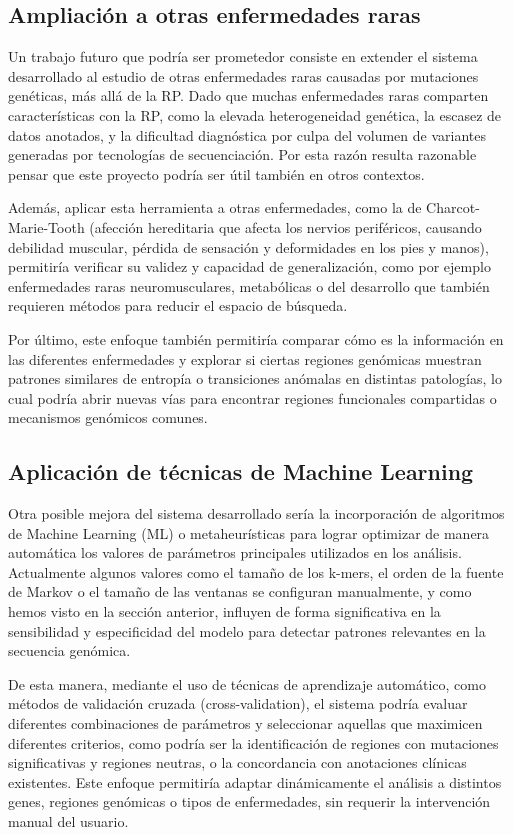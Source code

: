 \documentclass[11pt,spanish,listoffigures,listoftables]{tfgetsinf}
\begin{document}
\subsection{Ampliación a otras enfermedades raras}

Un trabajo futuro que podría ser prometedor consiste en extender el sistema desarrollado al estudio de otras enfermedades raras causadas por mutaciones genéticas, más allá de la \acs{RP}. Dado que muchas enfermedades raras comparten características con la \acs{RP}, como la elevada heterogeneidad genética, la escasez de datos anotados, y la dificultad diagnóstica por culpa del volumen de variantes generadas por tecnologías de secuenciación. Por esta razón resulta razonable pensar que este proyecto podría ser útil también en otros contextos.

Además, aplicar esta herramienta a otras enfermedades, como la de Charcot-Marie-Tooth (afección hereditaria que afecta los nervios periféricos, causando debilidad muscular, pérdida de sensación y deformidades en los pies y manos\cite{MEDL}), permitiría verificar su validez y capacidad de generalización, como por ejemplo enfermedades raras neuromusculares, metabólicas o del desarrollo que también requieren métodos para reducir el espacio de búsqueda.

Por último, este enfoque también permitiría comparar cómo es la información en las diferentes enfermedades y explorar si ciertas regiones genómicas muestran patrones similares de entropía o transiciones anómalas en distintas patologías, lo cual podría abrir nuevas vías para encontrar regiones funcionales compartidas o mecanismos genómicos comunes.

\subsection{Aplicación de técnicas de Machine Learning}

Otra posible mejora del sistema desarrollado sería la incorporación de algoritmos de Machine Learning (\acs{ML}) o metaheurísticas para lograr optimizar de manera automática los valores de parámetros principales utilizados en los análisis. Actualmente algunos valores como el tamaño de los k-mers, el orden de la fuente de Markov o el tamaño de las ventanas se configuran manualmente, y como hemos visto en la sección anterior, influyen de forma significativa en la sensibilidad y especificidad del modelo para detectar patrones relevantes en la secuencia genómica.

De esta manera, mediante el uso de técnicas de aprendizaje automático, como métodos de validación cruzada (cross-validation), el sistema podría evaluar diferentes combinaciones de parámetros y seleccionar aquellas que maximicen diferentes criterios, como podría ser la identificación de regiones con mutaciones significativas y regiones neutras, o la concordancia con anotaciones clínicas existentes. Este enfoque permitiría adaptar dinámicamente el análisis a distintos genes, regiones genómicas o tipos de enfermedades, sin requerir la intervención manual del usuario.
\end{document}
